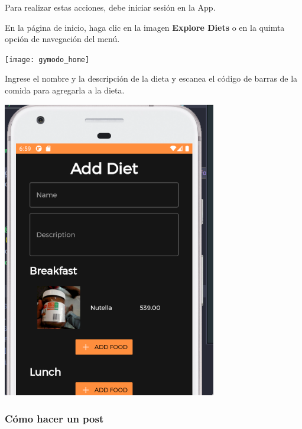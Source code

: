 \documentclass[12pt,a4paper]{article}
\begin{document}
\begin{enumerate}
\item Para realizar estas acciones, debe iniciar sesión en la App.

\begin{minipage}{.60\textwidth}
  \item En la página de inicio, haga clic en la imagen \textbf{Explore Diets} o en la quimta opción de navegación del menú.  
\end{minipage}
\begin{minipage}{.40\textwidth}
  \texttt{[image: gymodo\_home]}
\end{minipage}


\begin{minipage}{.60\textwidth}
  \item Ingrese el nombre y la descripción de la dieta y escanea el código de barras de la comida para agregarla a la dieta.
\end{minipage}
\begin{minipage}{.40\textwidth}
  \includegraphics[width=0.7\textwidth, right]{alimento}
\end{minipage}

\end{enumerate}


\clearpage

\subsubsection{Cómo hacer un post}
\end{document}
